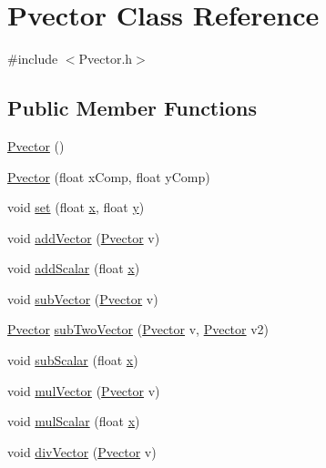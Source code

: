 \hypertarget{class_pvector}{}\section{Pvector Class Reference}
\label{class_pvector}


{\ttfamily \#include $<$Pvector.\+h$>$}

\subsection*{Public Member Functions}
\begin{DoxyCompactItemize}
\item 
\hyperlink{class_pvector_adbfc55ed132fa66b441510d2f6c74cb5}{Pvector} ()
\item 
\hyperlink{class_pvector_ada1a9423d48f67838d625ddf62149bcf}{Pvector} (float x\+Comp, float y\+Comp)
\item 
void \hyperlink{class_pvector_a77eb246570e459227cb4c317af0012b7}{set} (float \hyperlink{class_pvector_a7ba0ffff299fbf5e127d1849a9c5c87a}{x}, float \hyperlink{class_pvector_ab9d5ab87022aa781382b8eb4b944b375}{y})
\item 
void \hyperlink{class_pvector_aacdb0c22529bdfa27907013843f78963}{add\+Vector} (\hyperlink{class_pvector}{Pvector} v)
\item 
void \hyperlink{class_pvector_ab130e1e66e4a33ecf370203e43de191c}{add\+Scalar} (float \hyperlink{class_pvector_a7ba0ffff299fbf5e127d1849a9c5c87a}{x})
\item 
void \hyperlink{class_pvector_a11ea8cbdc8cc308d5509d5bb85142001}{sub\+Vector} (\hyperlink{class_pvector}{Pvector} v)
\item 
\hyperlink{class_pvector}{Pvector} \hyperlink{class_pvector_a255e0fda569608930ed7986763f6ab85}{sub\+Two\+Vector} (\hyperlink{class_pvector}{Pvector} v, \hyperlink{class_pvector}{Pvector} v2)
\item 
void \hyperlink{class_pvector_a0b07f3f6bbdf88179a0aac0bc58b73e1}{sub\+Scalar} (float \hyperlink{class_pvector_a7ba0ffff299fbf5e127d1849a9c5c87a}{x})
\item 
void \hyperlink{class_pvector_a70d8afa3b3b30c4c0877bdac66ad5e4a}{mul\+Vector} (\hyperlink{class_pvector}{Pvector} v)
\item 
void \hyperlink{class_pvector_aca5515b7c409f641c5565ca0f5bb2940}{mul\+Scalar} (float \hyperlink{class_pvector_a7ba0ffff299fbf5e127d1849a9c5c87a}{x})
\item 
void \hyperlink{class_pvector_aa855eaf087ce971b0aac806aa486793d}{div\+Vector} (\hyperlink{class_pvector}{Pvector} v)

\end{DoxyCompactItemize}
